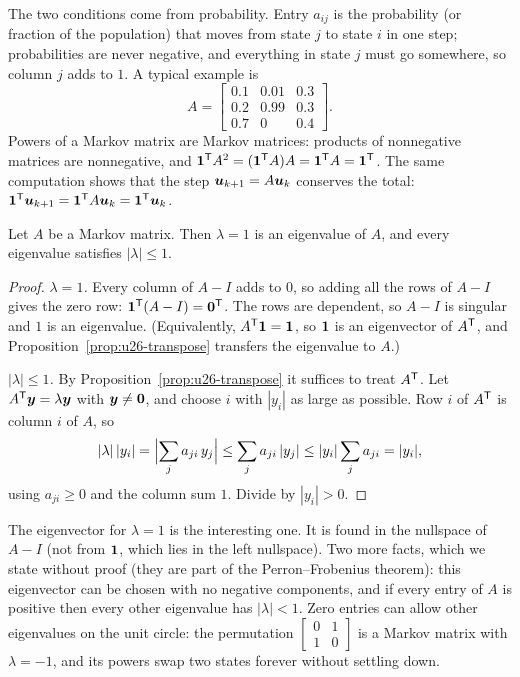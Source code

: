 The two conditions come from probability. Entry $a_{ij}$ is the probability (or fraction of
the population) that moves from state $j$ to state $i$ in one step; probabilities are never
negative, and everything in state $j$ must go somewhere, so column $j$ adds to $1$. A
typical example is
\[
  A=\begin{bmatrix} 0.1&0.01&0.3\\ 0.2&0.99&0.3\\ 0.7&0&0.4\end{bmatrix}.
\]
Powers of a Markov matrix are Markov matrices: products of nonnegative matrices are
nonnegative, and $\boldsymbol{1}^{\mathsf{T}} A^{2}=(\boldsymbol{1}^{\mathsf{T}} A)A=\boldsymbol{1}^{\mathsf{T}} A=\boldsymbol{1}^{\mathsf{T}}$. The same computation
shows that the step $\boldsymbol{u}_{k+1}=A\boldsymbol{u}_k$ conserves the total:
$\boldsymbol{1}^{\mathsf{T}}\boldsymbol{u}_{k+1}=\boldsymbol{1}^{\mathsf{T}} A\boldsymbol{u}_k=\boldsymbol{1}^{\mathsf{T}}\boldsymbol{u}_k$.

\begin{theorem}\label{thm:u26-markov}
Let $A$ be a Markov matrix. Then $\lambda=1$ is an eigenvalue of $A$, and every eigenvalue
satisfies $|\lambda|\le1$.
\end{theorem}

\begin{proof}
\emph{$\lambda=1$.} Every column of $A-I$ adds to $0$, so adding all the rows of $A-I$ gives
the zero row: $\boldsymbol{1}^{\mathsf{T}}(A-I)=\boldsymbol{0}^{\mathsf{T}}$. The rows are dependent, so $A-I$ is singular and $1$
is an eigenvalue. (Equivalently, $A^{\mathsf{T}}\boldsymbol{1}=\boldsymbol{1}$, so $\boldsymbol{1}$ is an eigenvector of $A^{\mathsf{T}}$,
and Proposition~\ref{prop:u26-transpose} transfers the eigenvalue to $A$.)

\emph{$|\lambda|\le1$.} By Proposition~\ref{prop:u26-transpose} it suffices to treat $A^{\mathsf{T}}$.
Let $A^{\mathsf{T}}\boldsymbol{y}=\lambda\boldsymbol{y}$ with $\boldsymbol{y}\neq\boldsymbol{0}$, and choose $i$ with $|y_i|$ as large as
possible. Row $i$ of $A^{\mathsf{T}}$ is column $i$ of $A$, so
\[
  |\lambda|\,|y_i|=\Bigl|\sum_j a_{ji}\,y_j\Bigr|\le\sum_j a_{ji}\,|y_j|\le|y_i|\sum_j a_{ji}=|y_i|,
\]
using $a_{ji}\ge0$ and the column sum $1$. Divide by $|y_i|>0$.
\end{proof}

The eigenvector for $\lambda=1$ is the interesting one. It is found in the nullspace of $A-I$
(not from $\boldsymbol{1}$, which lies in the left nullspace). Two more facts, which we state without
proof (they are part of the Perron--Frobenius theorem): this eigenvector can be chosen with
no negative components, and if every entry of $A$ is positive then every other eigenvalue has
$|\lambda|<1$. Zero entries can allow other eigenvalues on the unit circle: the permutation
$\left[\begin{smallmatrix} 0&1\\ 1&0\end{smallmatrix}\right]$ is a Markov matrix with
$\lambda=-1$, and its powers swap two states forever without settling down.

